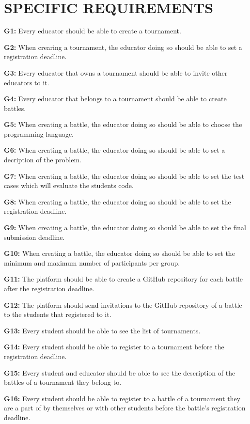 \documentclass{article}
\begin{document}
\section{SPECIFIC REQUIREMENTS}
\iffalse
    \item \textbf{G1:} Every educator should be able to create a tournament.
    \item \textbf{G2:} When crearing a tournament, the educator doing so should be able to set a registration deadline.
    \item \textbf{G3:} Every educator that owns a tournament should be able to invite other educators to it.
    \item \textbf{G4:} Every educator that belongs to a tournament should be able to create battles.
    \item \textbf{G5:} When creating a battle, the educator doing so should be able to choose the programming language.
    \item \textbf{G6:} When creating a battle, the educator doing so should be able to set a decription of the problem.
    \item \textbf{G7:} When creating a battle, the educator doing so should be able to set the test cases which will evaluate the students code.
    \item \textbf{G8:} When creating a battle, the educator doing so should be able to set the registration deadline.
    \item \textbf{G9:} When creating a battle, the educator doing so should be able to set the final submission deadline.
    \item \textbf{G10:} When creating a battle, the educator doing so should be able to set the minimum and maximum number of participants per group.
    \item \textbf{G11:} The platform should be able to create a GitHub repository for each battle after the registration deadline.
    \item \textbf{G12:} The platform should send invitations to the GitHub repository of a battle to the students that registered to it.
    \item \textbf{G13:} Every student should be able to see the list of tournaments.
    \item \textbf{G14:} Every student should be able to register to a tournament before the registration deadline.
    \item \textbf{G15:} Every student and educator should be able to see the description of the battles of a tournament they belong to.
    \item \textbf{G16:} Every student should be able to register to a battle of a tournament they are a part of by themselves or with other students before the battle's registration deadline.
\end{document}
